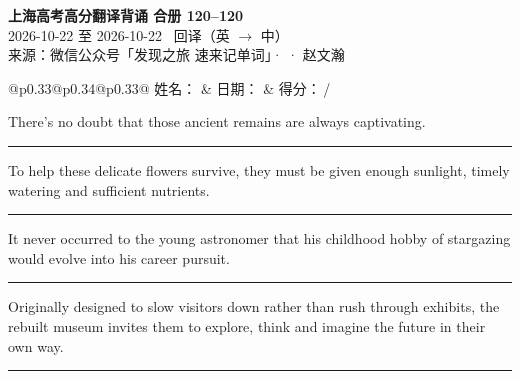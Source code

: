 \documentclass[11pt,a4paper]{article}
\newcommand{\num}[1]{\makebox[1.9em][r]{#1.}\hspace{0.3em}}
\newcommand{\wline}{\noindent\rule{\linewidth}{0.4pt}}
\begin{document}
\pagestyle{plain}
\begin{center}
{\LARGE\bfseries 上海高考高分翻译背诵 \quad 合册 120–120}\\[0.25em]
{\large 2026-10-22 至 2026-10-22 \quad\ 回译（英 $\to$ 中）}\\[0.35em]
{\footnotesize 来源：微信公众号「发现之旅 速来记单词」·  · 赵文瀚}
\end{center}

\vspace{0.4em}
\noindent\begin{tabular}{@{}p{0.33\textwidth}@{}p{0.34\textwidth}@{}p{0.33\textwidth}@{}}
姓名：\underline{\hspace{2.0cm}} & 日期：\underline{\hspace{2.0cm}} & 得分：\underline{\hspace{1.4cm}}\,/ \\
\end{tabular}

\vspace{0.5em}

\vspace{0.8em}
\vspace{0.35em}\vspace{0.15em}

\begin{minipage}{\linewidth}

\num{1}There’s no doubt that those ancient remains are always captivating.

\vspace{0.25em}

\wline

\end{minipage}

\begin{minipage}{\linewidth}

\num{2}To help these delicate flowers survive, they must be given enough sunlight, timely watering and sufficient nutrients.

\vspace{0.25em}

\wline

\end{minipage}

\begin{minipage}{\linewidth}

\num{3}It never occurred to the young astronomer that his childhood hobby of stargazing would evolve into his career pursuit.

\vspace{0.25em}

\wline

\end{minipage}

\begin{minipage}{\linewidth}

\num{4}Originally designed to slow visitors down rather than rush through exhibits, the rebuilt museum invites them to explore, think and imagine the future in their own way.

\vspace{0.25em}

\wline

\end{minipage}
\end{document}
